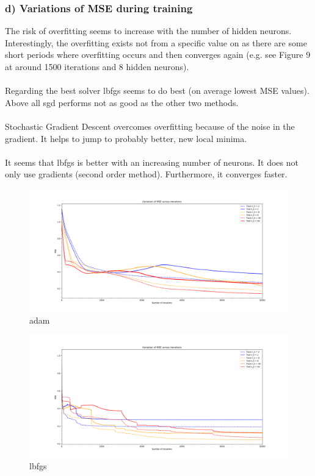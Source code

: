  \subsubsection*{d) Variations of MSE during training}
The risk of overfitting seems to increase with the number of hidden neurons. Interestingly, the overfitting exists not from a specific value on as there are some short periods where overfitting occurs and then converges again (e.g. see Figure 9 at around 1500 iterations and 8 hidden neurons). \\\\
Regarding the best solver lbfgs seems to do best (on average lowest MSE values). Above all sgd performs not as good as the other two methods.\\\\
Stochastic Gradient Descent overcomes overfitting because of the noise in the gradient. It helps to jump to probably better, new local minima.\\\\
It seems that lbfgs is better with an increasing number of neurons. It does not only use gradients (second order method). Furthermore, it converges faster.

\begin{figure}[!htbp]
	\centering
        \includegraphics[width=14cm]{1_1_d_adam_rs0}
	\caption{adam}
\end{figure}

\begin{figure}[!htbp]
	\centering
        \includegraphics[width=14cm]{1_1_d_lbfgs_rs0}
	\caption{lbfgs}
\end{figure}

